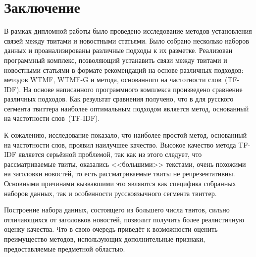 \section*{Заключение}
    В рамках дипломной работы было проведено исследование методов установления связей между твитами и новостными статьями.
    Было собрано несколько наборов данных и проанализированы различные подходы к их разметке.
    Реализован программный комплекс, позволяющий устанавить связи между твитами и новостными статьями в формате рекомендаций на основе различных подходов: методов WTMF, WTMF-G и метода, основанного на частотности слов~(TF-IDF).
    На основе написанного программного комплекса произведено сравнение различных подходов.
    Как результат сравнения получено, что в для русского сегмента твиттера наиболее оптимальным подходом является метод, основанный на частотности слов~(TF-IDF).

    К сожалению, исследование показало, что наиболее простой метод, основанный на частотности слов, проявил наилучшее качество.
    Высокое качество метода TF-IDF является серьёзной проблемой, так как из этого следует, что рассматриваемые твиты,
    оказались <<большими>> текстами, очень похожими на заголовки новостей, то есть рассматриваемые твиты не репрезентативны.
    Основными причинами вызвавшими это являются как специфика собранных наборов данных, так и особенности русскоязычного сегмента твиттер.

    Построение набора данных, состоящего из большего числа твитов, сильно отличающихся от заголовков новостей, позволит
    получить более реалистичную оценку качества. Что в свою очередь приведёт к возможности оценить преимущество методов,
    использующих дополнительные признаки, предоставляемые предметной областью.
    